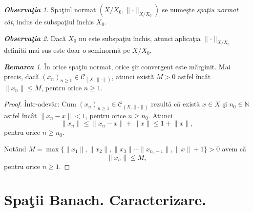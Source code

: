 \documentclass[ a4paper, 12pt]{report}
\theoremstyle{definition}
\theoremstyle{remark}
\newtheorem{remarc}{\bf Remarca}[section]
\newtheorem{obs}{\bf Observa\c tia }[section]
\numberwithin{equation}{section}
\begin{document}
\begin{obs}
Spa\c tiul normat $\left(  X/X_0, \lVert \cdot \rVert_{X/X_0} \right)$ se nume\c ste \emph{spa\c tiu normat c\^at}, indus de subspa\c tiul \^inchis $X_0$.
\end{obs}
\begin{obs}
Dac\u a $X_0$ nu este subspa\c tiu \^inchis, atunci aplica\c tia $\lVert \cdot \rVert_{X/X_0}$ definit\u a mai sus este doar o seminorm\u a pe $X/X_0.$
\end{obs}
\begin{remarc}
\^In orice spa\c tiu normat, orice \c sir convergent este m\u arginit. Mai precis,  dac\u a $(x_n)_{n \geq 1} \in \mathcal{C}_{(X, \lVert \cdot \rVert)}$,  atunci exist\u a $ M>0$ astfel \^inc\^at $\lVert x_n \rVert \leq M$, pentru orice $ n \geq 1.$
\end{remarc}

\begin{proof}
\^Intr-adev\u ar: Cum $(x_n)_{n \geq 1} \in \mathcal{C}_{(X, \lVert \cdot \rVert)}$ rezult\u a c\u a exist\u a  $x \in X$ \c si $n_0 \in \mathbb{N}$ astfel \^inc\^at $\lVert x_n - x \rVert <1$, pentru orice  $n \geq n_0$. Atunci
$$ \lVert x_n \rVert \leq \lVert x_n - x \rVert +  \lVert x \rVert \leq 1 +  \lVert x \rVert,$$ pentru orice $ n \geq n_0.$

Not\^and $M = \max\{ \lVert x_1 \rVert, \lVert x_2 \rVert, \lVert x_3 \rVert \cdots \lVert x_{n_{0} -1} \rVert, \lVert x \rVert +1 \} >0$ avem c\u a
 $$\lVert x_n \rVert \leq M,$$ pentru orice $ n \geq 1.$
\end{proof}







\section{Spa\c tii Banach. Caracterizare.}
\end{document}

